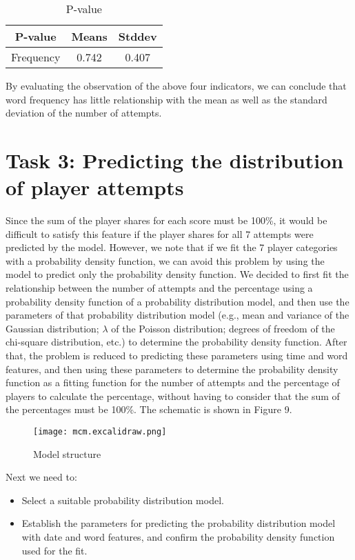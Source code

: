 \documentclass[12pt]{article}  %
\begin{document}
\begin{table*}
	\centering
	\begin{tabular}{  |c|c|c|
		}
		
		\hline
		P-value 	& Means & Stddev \\ 
		\hline
		Frequency	& 0.742  &  0.407 \\ 
		\hline 
		
	\end{tabular}
	\caption{P-value}
	\label{tab:Spearman-f-p}
\end{table*}
By evaluating the observation of the above four indicators, we can conclude that word frequency has little relationship with the mean as well as the standard deviation of the number of attempts.


\section{Task 3: Predicting the distribution of player attempts}
Since the sum of the player shares for each score must be 100\%, it would be difficult to satisfy this feature if the player shares for all 7 attempts were predicted by the model. However, we note that if we fit the 7 player categories with a probability density function, we can avoid this problem by using the model to predict only the probability density function. We decided to first fit the relationship between the number of attempts and the percentage using a probability density function of a probability distribution model, and then use the parameters of that probability distribution model (e.g., mean and variance of the Gaussian distribution; $\lambda$ of the Poisson distribution; degrees of freedom of the chi-square distribution, etc.) to determine the probability density function. After that, the problem is reduced to predicting these parameters using time and word features, and then using these parameters to determine the probability density function as a fitting function for the number of attempts and the percentage of players to calculate the percentage, without having to consider that the sum of the percentages must be 100\%. The schematic is shown in Figure 9.

\begin{figure}[H]
	\centering
	\texttt{[image: mcm.excalidraw.png]}
	\caption{Model structure}
	\label{img8}
\end{figure}

Next we need to:
\begin{itemize}
	\item Select a suitable probability distribution model.
	\item Establish the parameters for predicting the probability distribution model with date and word features, and confirm the probability density function used for the fit.
\end{itemize}
\end{document}
